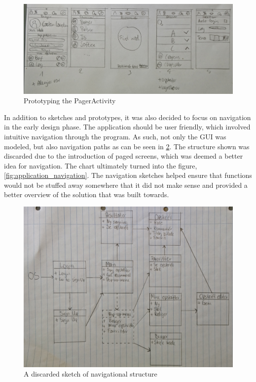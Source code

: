 \begin{figure}[H]
	\centering
	\includegraphics[width=\textwidth]{Pictures/prototype_pageractivity.jpg}
	\caption{Prototyping the PagerActivity}
	\label{fig:prototype_pageractivity}
\end{figure}

In addition to sketches and prototypes, it was also decided to focus on navigation in the early design phase. The application should be user friendly, which involved intuitive navigation through the program. As such, not only the GUI was modeled, but also navigation paths as can be seen in \ref{fig:prototype_structure}. The structure shown was discarded due to the introduction of paged screens, which was deemed a better idea for navigation. The chart ultimately turned into the figure, \ref{fig:application_navigation}. The navigation sketches helped ensure that functions would not be stuffed away somewhere that it did not make sense and provided a better overview of the solution that was built towards.

\begin{figure}[H]
	\centering
	\includegraphics[width=\textwidth]{Pictures/prototype_structure.jpg}
	\caption{A discarded sketch of navigational structure}
	\label{fig:prototype_structure}
\end{figure}